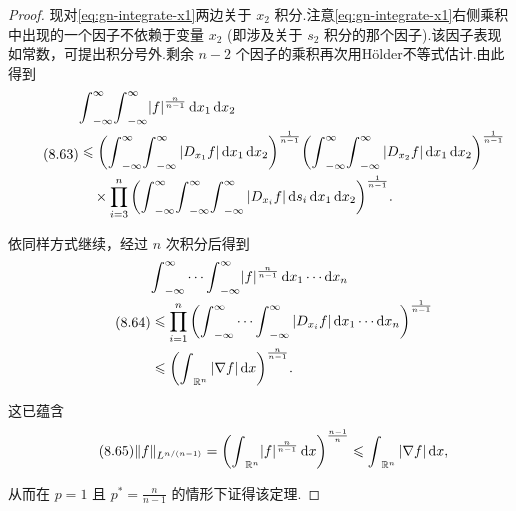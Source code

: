 \begin{proof}
现对\eqref{eq:gn-integrate-x1}两边关于 ${x}_{2}$ 积分.注意\eqref{eq:gn-integrate-x1}右侧乘积中出现的一个因子不依赖于变量 ${x}_{2}$ (即涉及关于 ${s}_{2}$ 积分的那个因子).该因子表现如常数，可提出积分号外.剩余 $n - 2$ 个因子的乘积再次用Hölder不等式估计.由此得到
\begin{equation}\tag{8.63}\label{eq:gn-integrate-x2}
\begin{aligned}
&{\int }_{-\infty }^{\infty }{\int }_{-\infty }^{\infty }{\left| f\right| }^{\frac{n}{n - 1}}\d x_{1}\d x_{2}\\
&\leq  {\left( {\int }_{-\infty }^{\infty }{\int }_{-\infty }^{\infty }\left| {D}_{{x}_{1}}f\right| \d x_{1}\d x_{2}\right) }^{\frac{1}{n - 1}}{\left( {\int }_{-\infty }^{\infty }{\int }_{-\infty }^{\infty }\left| {D}_{{x}_{2}}f\right| \d x_{1}\d x_{2}\right) }^{\frac{1}{n - 1}} \\
&\quad\times  \mathop{\prod }\limits_{{i = 3}}^{n}{\left( {\int }_{-\infty }^{\infty }{\int }_{-\infty }^{\infty }{\int }_{-\infty }^{\infty }\left| {D}_{{x}_{i}}f\right| \d s_{i}\d x_{1}\d x_{2}\right) }^{\frac{1}{n - 1}}.
\end{aligned}
\end{equation}

依同样方式继续，经过 $n$ 次积分后得到
\begin{equation}\tag{8.64}\label{eq:gn-integrate-xn}
\begin{aligned}
&{\int }_{-\infty }^{\infty }\cdots {\int }_{-\infty }^{\infty }{\left| f\right| }^{\frac{n}{n - 1}}\mathop{}\!\mathrm{d} x_{1}\cdots \mathop{}\!\mathrm{d} x_{n}\\
&\leqslant  \mathop{\prod }\limits_{{i = 1}}^{n}{\left( {\int }_{-\infty }^{\infty }\cdots {\int }_{-\infty }^{\infty }\left| {D}_{{x}_{i}}f\right| \mathop{}\!\mathrm{d} x_{1}\cdots \mathop{}\!\mathrm{d} x_{n}\right) }^{\frac{1}{n - 1}} \\
&\leqslant  {\left( {\int }_{{\mathbb{R}}^{n}}\left| \nabla f\right| \mathop{}\!\mathrm{d}x\right) }^{\frac{n}{n - 1}}.
\end{aligned}
\end{equation}

这已蕴含
\begin{equation}\tag{8.65}\label{eq:gn-p1-case}
\| f{\| }_{{L}^{n/\left( {n - 1}\right) }} = {\left( {\int }_{{\mathbb{R}}^{n}}{\left| f\right| }^{\frac{n}{n - 1}}\mathop{}\!\mathrm{d} x\right) }^{\frac{n - 1}{n}} \leqslant  {\int }_{{\mathbb{R}}^{n}}\left| {\nabla f}\right| {\mathop{}\!\mathrm{d} x},
\end{equation}

从而在 $p = 1$ 且 ${p}^{ * } = \frac{n}{n - 1}$ 的情形下证得该定理.


\end{proof}
